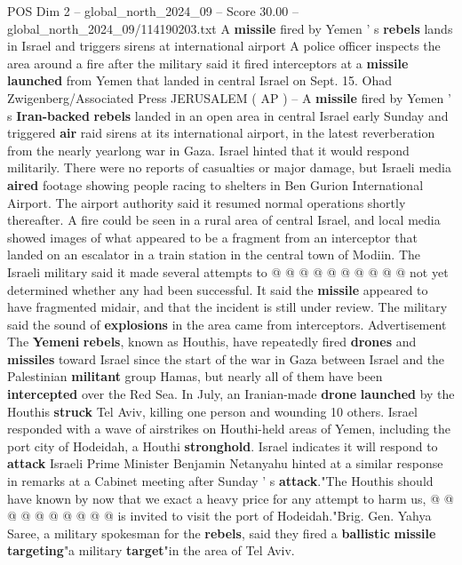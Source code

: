 \begin{textsample}{POS Dim 2 – global\_north\_2024\_09 – Score 30.00 – global\_north\_2024\_09/114190203.txt}  \label{ex:f2_pos_125}
A \textbf{missile} fired by Yemen ' s \textbf{rebels} lands in Israel and triggers sirens at international airport A police officer inspects the area around a fire after the military said it fired interceptors at a \textbf{missile} \textbf{launched} from Yemen that landed in central Israel on Sept. 15.
Ohad Zwigenberg/Associated Press JERUSALEM ( AP ) -- A \textbf{missile} fired by Yemen ' s \textbf{Iran-backed} \textbf{rebels} landed in an open area in central Israel early Sunday and triggered \textbf{air} raid sirens at its international airport, in the latest reverberation from the nearly yearlong war in Gaza.
Israel hinted that it would respond militarily.
There were no reports of casualties or major damage, but Israeli media \textbf{aired} footage showing people racing to shelters in Ben Gurion International Airport.
The airport authority said it resumed normal operations shortly thereafter.
A fire could be seen in a rural area of central Israel, and local media showed images of what appeared to be a fragment from an interceptor that landed on an escalator in a train station in the central town of Modiin.
The Israeli military said it made several attempts to @ @ @ @ @ @ @ @ @ @ not yet determined whether any had been successful.
It said the \textbf{missile} appeared to have fragmented midair, and that the incident is still under review.
The military said the sound of \textbf{explosions} in the area came from interceptors.
Advertisement The \textbf{Yemeni} \textbf{rebels}, known as Houthis, have repeatedly fired \textbf{drones} and \textbf{missiles} toward Israel since the start of the war in Gaza between Israel and the Palestinian \textbf{militant} group Hamas, but nearly all of them have been \textbf{intercepted} over the Red Sea.
In July, an Iranian-made \textbf{drone} \textbf{launched} by the Houthis \textbf{struck} Tel Aviv, killing one person and wounding 10 others.
Israel responded with a wave of airstrikes on Houthi-held areas of Yemen, including the port city of Hodeidah, a Houthi \textbf{stronghold}.
Israel indicates it will respond to \textbf{attack} Israeli Prime Minister Benjamin Netanyahu hinted at a similar response in remarks at a Cabinet meeting after Sunday ' s \textbf{attack}."The Houthis should have known by now that we exact a heavy price for any attempt to harm us, @ @ @ @ @ @ @ @ @ @ is invited to visit the port of Hodeidah."Brig.
Gen.
Yahya Saree, a military spokesman for the \textbf{rebels}, said they fired a \textbf{ballistic} \textbf{missile} \textbf{targeting}"a military \textbf{target}"in the area of Tel Aviv.

\end{textsample}
